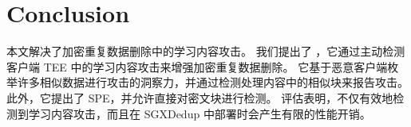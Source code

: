 \section{Conclusion}
\label{sec:conclusion}
本文解决了加密重复数据删除中的学习内容攻击。 我们提出了 \sysnameF，它通过主动检测客户端 TEE 中的学习内容攻击来增强加密重复数据删除。 它基于恶意客户端枚举许多相似数据进行攻击的洞察力，并通过检测处理内容中的相似块来报告攻击。 此外，它提出了 SPE，并允许直接对密文块进行检测。 评估表明，\sysnameF 不仅有效地检测到学习内容攻击，而且在 SGXDedup \cite{ren21} 中部署时会产生有限的性能开销。
